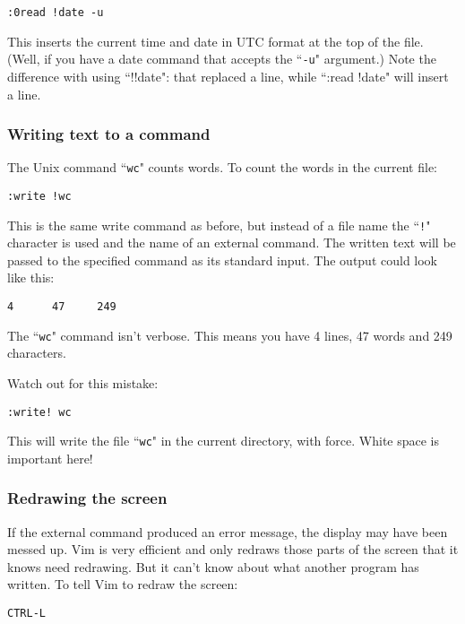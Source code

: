 \begin{Verbatim}[samepage=true]
 :0read !date -u
\end{Verbatim}

This inserts the current time and date in UTC format at the top of the file.
(Well, if you have a date command that accepts the ``\texttt{-u}" argument.)
Note the difference with using ``!!date": that replaced a line, while ``:read !date" will insert a line.
\subsubsection{Writing text to a command}
The Unix command ``\texttt{wc}" counts words.
To count the words in the current file:

\begin{Verbatim}[samepage=true]
 :write !wc
\end{Verbatim}

This is the same write command as before, but instead of a file name the ``\texttt{!}" character is used and the name of an external command.
The written text will be passed to the specified command as its standard input.
The output could look like this:

\begin{Verbatim}[samepage=true]
       4      47     249
\end{Verbatim}

The ``\texttt{wc}" command isn't verbose.
This means you have 4 lines, 47 words and 249 characters.

Watch out for this mistake:

\begin{Verbatim}[samepage=true]
 :write! wc
\end{Verbatim}

This will write the file ``\texttt{wc}" in the current directory, with force.
White space is important here!

\subsubsection{Redrawing the screen}
If the external command produced an error message, the display may have been messed up.
Vim is very efficient and only redraws those parts of the screen that it knows need redrawing.
But it can't know about what another program has written.
To tell Vim to redraw the screen:

\begin{Verbatim}[samepage=true]
 CTRL-L
\end{Verbatim}
\clearpage

